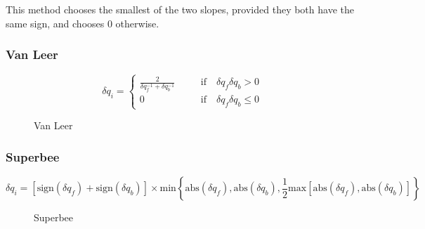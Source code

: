 This method chooses the smallest of the two slopes, provided they both have the same sign, and
chooses 0 otherwise.

\subsubsection{Van Leer}

\begin{equation}
\delta q_i = \left\{
\begin{array}{ccc}
\frac{2}{\delta q_f^{-1} + \delta q_b^{-1}} & \quad & \mathrm{if} \quad \delta q_f \delta q_b > 0  \\
0 &\quad & \mathrm{if} \quad  \delta q_f \delta q_b \leq 0
\end{array}\right.
\end{equation}

\begin{figure}
  \begin{center}
  \end{center}
  \caption[]{Van Leer}
  \label{fig:vanleer}
\end{figure}

\subsubsection{Superbee}

\begin{equation}
\delta q_i = \left[\mbox{sign}(\delta q_f) + \mbox{sign}(\delta q_b)\right] \times 
\mathrm{min} \left\{ \mbox{abs}(\delta q_f), \mbox{abs}(\delta q_b), \frac{1}{2} \mbox{max} \left[\mbox{abs}(\delta q_f),\mathrm{abs}\left(\delta q_b\right) \right]\right\}
\end{equation}


\begin{figure}
  \begin{center}
  \end{center}
  \caption[]{Superbee}
  \label{fig:superbee}
\end{figure}

